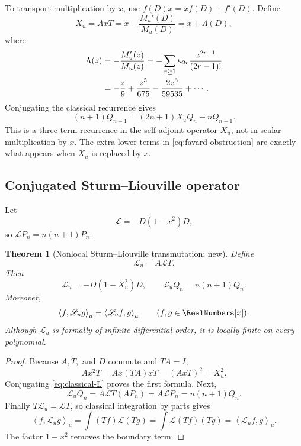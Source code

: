 \documentclass[11pt,oneside]{article}
\numberwithin{equation}{section}
\newtheorem{theorem}{Theorem}[section]
\theoremstyle{definition}
\theoremstyle{remark}
\newcommand{\M}{M_u}
\newcommand{\Lscr}{\mathscr L_u}
\newcommand{\inner}[2]{\left\langle #1,#2\right\rangle}
\begin{document}
To transport multiplication by $x$, use $f(D)x=xf(D)+f'(D)$.  Define
\begin{equation}
 X_u=AxT=x-\frac{\M'(D)}{\M(D)}=x+\Lambda(D),
 \label{eq:Xu}
\end{equation}
where
\begin{align}
 \Lambda(z)&=-\frac{\M'(z)}{\M(z)}
 =-\sum_{r\ge1}\kappa_{2r}\frac{z^{2r-1}}{(2r-1)!}\notag\\
 &=-\frac z9+\frac{z^3}{675}-\frac{2z^5}{59535}+\cdots.
 \label{eq:Lambda-series}
\end{align}
Conjugating the classical recurrence gives
\begin{equation}
 \boxed{
 (n+1)Q_{n+1}=(2n+1)X_uQ_n-nQ_{n-1}.}
 \label{eq:Q-recurrence}
\end{equation}
This is a three-term recurrence in the self-adjoint operator $X_u$, not in
scalar multiplication by $x$.  The extra lower terms in
\eqref{eq:favard-obstruction} are exactly what appears when $X_u$ is replaced
by $x$.

\subsection{Conjugated Sturm--Liouville operator}

Let
\begin{equation}
 \mathcal L=-D(1-x^2)D,
 \label{eq:classical-L}
\end{equation}
so $\mathcal LP_n=n(n+1)P_n$.

\begin{theorem}[Nonlocal Sturm--Liouville transmutation; new]
\label{thm:nonlocal-SL}
Define
\begin{equation}
 \Lscr=A\mathcal LT.
 \label{eq:Lu-conjugate}
\end{equation}
Then
\begin{equation}
 \boxed{
 \Lscr=-D(1-X_u^2)D,\qquad
 \Lscr Q_n=n(n+1)Q_n.}
 \label{eq:Lu-formula}
\end{equation}
Moreover,
\begin{equation}
 \inner{f}{\Lscr g}_u=\inner{\Lscr f}{g}_u
 \qquad(f,g\in\RealNumbers[x]).
 \label{eq:Lu-symmetric}
\end{equation}
Although $\Lscr$ is formally of infinite differential order, it is locally
finite on every polynomial.
\end{theorem}

\begin{proof}
Because $A,T,$ and $D$ commute and $TA=I$,
\[
 Ax^2T=Ax(TA)xT=(AxT)^2=X_u^2.
\]
Conjugating \eqref{eq:classical-L} proves the first formula.  Next,
\[
 \Lscr Q_n=A\mathcal LT(AP_n)=A\mathcal LP_n=n(n+1)Q_n.
\]
Finally $T\Lscr=\mathcal LT$, so classical integration by parts gives
\[
 \inner{f}{\Lscr g}_u
 =\int(Tf)\mathcal L(Tg)
 =\int\mathcal L(Tf)(Tg)
 =\inner{\Lscr f}{g}_u.
\]
The factor $1-x^2$ removes the boundary term.
\end{proof}
\end{document}

